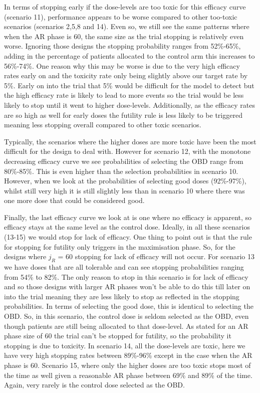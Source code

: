 In terms of stopping early if the dose-levels are too toxic for this efficacy curve (scenario 11), performance appears to be worse compared to other too-toxic scenarios (scenarios 2,5,8 and 14). Even so, we still see the same patterns where when the AR phase is 60, the same size as the trial stopping is relatively even worse. Ignoring those designs the stopping probability ranges from 52\%-65\%, adding in the percentage of patients allocated to the control arm this increases to 56\%-74\%. One reason why this may be worse is due to the very high efficacy rates early on and the toxicity rate only being slightly above our target rate by 5\%. Early on into the trial that 5\% would be difficult for the model to detect but the high efficacy rate is likely to lead to more events so the trial would be less likely to stop until it went to higher dose-levels. Additionally, as the efficacy rates are so high as well for early doses the futility rule is less likely to be triggered meaning less stopping overall compared to other toxic scenarios.  

Typically, the scenarios where the higher doses are more toxic have been the most difficult for the design to deal with. However for scenario 12, with the monotone decreasing efficacy curve we see probabilities of selecting the OBD range from 80\%-85\%. This is even higher than the selection probabilities in scenario 10. However, when we look at the probabilities of selecting good doses (92\%-97\%), whilst still very high it is still slightly less than in scenario 10 where there was one more dose that could be considered good. 

Finally, the last efficacy curve we look at is one where no efficacy is apparent, so efficacy stays at the same level as the control dose. Ideally, in all these scenarios (13-15) we would stop for lack of efficacy. One thing to point out is that the rule for stopping for futility only triggers in the maximisation phase. So, for the designs where $j_R$ = 60 stopping for lack of efficacy will not occur. For scenario 13 we have doses that are all tolerable and can see stopping probabilities ranging from 54\% to 82\%. The only reason to stop in this scenario is for lack of efficacy and so those designs with larger AR phases won't be able to do this till later on into the trial meaning they are less likely to stop as reflected in the stopping probabilities. In terms of selecting the good dose, this is identical to selecting the OBD. So, in this scenario, the control dose is seldom selected as the OBD, even though patients are still being allocated to that dose-level. As stated for an AR phase size of 60 the trial can't be stopped for futility, so the probability it stopping is due to toxicity. In scenario 14, all the dose-levels are toxic, here we have very high stopping rates between 89\%-96\% except in the case when the AR phase is 60. Scenario 15, where only the higher doses are too toxic stops most of the time as well given a reasonable AR phase between 69\% and 89\% of the time. Again, very rarely is the control dose selected as the OBD. 

